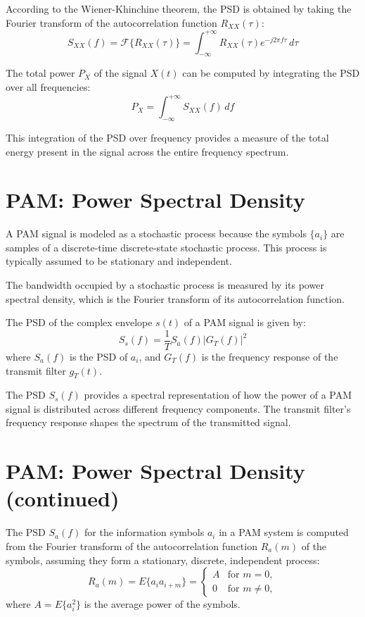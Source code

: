 According to the Wiener-Khinchine theorem, the PSD is obtained by taking the Fourier transform of the autocorrelation function \( R_{XX}(\tau) \):
\[ S_{XX}(f) = \mathcal{F}\{R_{XX}(\tau)\} = \int_{-\infty}^{+\infty} R_{XX}(\tau)e^{-j2\pi f\tau} \, d\tau \]

The total power \( P_X \) of the signal \( X(t) \) can be computed by integrating the PSD over all frequencies:
\[ P_X = \int_{-\infty}^{+\infty} S_{XX}(f) \, df \]

This integration of the PSD over frequency provides a measure of the total energy present in the signal across the entire frequency spectrum.


\section*{PAM: Power Spectral Density}

A PAM signal is modeled as a stochastic process because the symbols \( \{a_i\} \) are samples of a discrete-time discrete-state stochastic process. This process is typically assumed to be stationary and independent.

The bandwidth occupied by a stochastic process is measured by its power spectral density, which is the Fourier transform of its autocorrelation function.

The PSD of the complex envelope \( s(t) \) of a PAM signal is given by:
\[ S_s(f) = \frac{1}{T} S_a(f) |G_T(f)|^2 \]
where \( S_a(f) \) is the PSD of \( a_i \), and \( G_T(f) \) is the frequency response of the transmit filter \( g_T(t) \).

The PSD \( S_s(f) \) provides a spectral representation of how the power of a PAM signal is distributed across different frequency components. The transmit filter's frequency response shapes the spectrum of the transmitted signal.


\section*{PAM: Power Spectral Density (continued)}

The PSD \( S_a(f) \) for the information symbols \( a_i \) in a PAM system is computed from the Fourier transform of the autocorrelation function \( R_a(m) \) of the symbols, assuming they form a stationary, discrete, independent process:
\[ R_a(m) = E\{a_i a_{i+m}\} = 
\begin{cases} 
A & \text{for } m = 0, \\
0 & \text{for } m \neq 0,
\end{cases} \]
where \( A = E\{a_i^2\} \) is the average power of the symbols.

